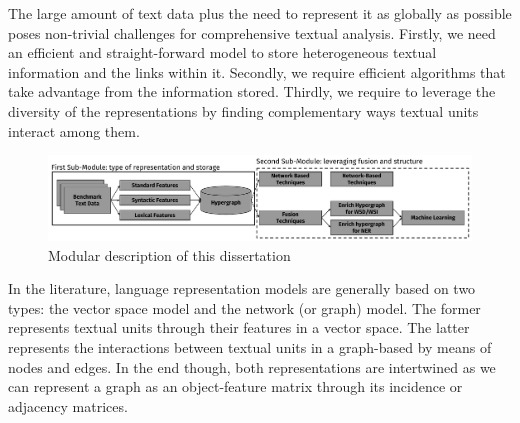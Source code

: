 The  large amount of text data plus the need to represent it as globally as possible poses non-trivial challenges for comprehensive textual analysis. Firstly, we need an efficient and straight-forward model to store heterogeneous textual information and the links within it. Secondly, we require efficient algorithms that take advantage from the information stored. Thirdly, we require to leverage the diversity of the representations by finding complementary ways textual units interact among them. 

\begin{figure}
\centering
\includegraphics[width=1\linewidth]{./images/Chapitre1/main_diag2.pdf}
\caption{Modular description of this dissertation}
\label{fig:maindiag}
\end{figure}


In the literature, language representation models are generally based on two types: the vector space model and the network (or graph) model. The former represents textual units through their features in a vector space. The latter represents the interactions between textual units in a graph-based by means of nodes and edges. In the end though, both representations are intertwined as we can represent a graph as an object-feature matrix through its incidence or adjacency matrices.




